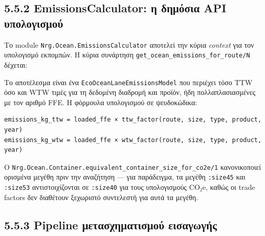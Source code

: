 \subsection{5.5.2 EmissionsCalculator: η δημόσια API
υπολογισμού}\label{emissionscalculator-ux3b7-ux3b4ux3b7ux3bcux3ccux3c3ux3b9ux3b1-api-ux3c5ux3c0ux3bfux3bbux3bfux3b3ux3b9ux3c3ux3bcux3bfux3cd}

Το module \texttt{Nrg.Ocean.EmissionsCalculator} αποτελεί την κύρια
\emph{context} για τον υπολογισμό εκπομπών. Η κύρια συνάρτηση
\texttt{get\_ocean\_emissions\_for\_route/N} δέχεται:

\begin{Shaded}
\begin{Highlighting}[]
\FunctionTok{(}
\FunctionTok{()}
\FunctionTok{)}
\end{Highlighting}
\end{Shaded}

Το αποτέλεσμα είναι ένα \texttt{EcoOceanLaneEmissionsModel} που περιέχει
τόσο TTW όσο και WTW τιμές για τη δεδομένη διαδρομή και προϊόν, ήδη
πολλαπλασιασμένες με τον αριθμό FFE. Η φόρμουλα υπολογισμού σε
ψευδοκώδικα:

\begin{verbatim}
emissions_kg_ttw = loaded_ffe × ttw_factor(route, size, type, product, year)
emissions_kg_wtw = loaded_ffe × wtw_factor(route, size, type, product, year)
\end{verbatim}

Ο \texttt{Nrg.Ocean.Container.equivalent\_container\_size\_for\_co2e/1}
κανονικοποιεί ορισμένα μεγέθη πριν την αναζήτηση --- για παράδειγμα, τα
μεγέθη \texttt{:size45} και \texttt{:size53} αντιστοιχίζονται σε
\texttt{:size40} για τους υπολογισμούς CO₂e, καθώς οι trade factors δεν
διαθέτουν ξεχωριστό συντελεστή για αυτά τα μεγέθη.

\subsection{5.5.3 Pipeline μετασχηματισμού
εισαγωγής}\label{pipeline-ux3bcux3b5ux3c4ux3b1ux3c3ux3c7ux3b7ux3bcux3b1ux3c4ux3b9ux3c3ux3bcux3bfux3cd-ux3b5ux3b9ux3c3ux3b1ux3b3ux3c9ux3b3ux3aeux3c2}

